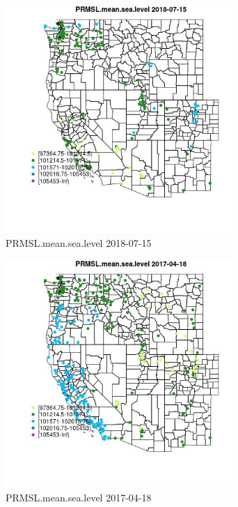 \begin{figure} 
\centering  
\includegraphics[width=0.77\textwidth]{Code_Outputs/Report_ML_input_PM25_Step4_part_e_de_duplicated_aves_compiled_2019-05-20wNAs_MapObsPRMSLmeansealevel2018-07-15.jpg} 
\caption{\label{fig:Report_ML_input_PM25_Step4_part_e_de_duplicated_aves_compiled_2019-05-20wNAsMapObsPRMSLmeansealevel2018-07-15}PRMSL.mean.sea.level 2018-07-15} 
\end{figure} 
 

\begin{figure} 
\centering  
\includegraphics[width=0.77\textwidth]{Code_Outputs/Report_ML_input_PM25_Step4_part_e_de_duplicated_aves_compiled_2019-05-20wNAs_MapObsPRMSLmeansealevel2017-04-18.jpg} 
\caption{\label{fig:Report_ML_input_PM25_Step4_part_e_de_duplicated_aves_compiled_2019-05-20wNAsMapObsPRMSLmeansealevel2017-04-18}PRMSL.mean.sea.level 2017-04-18} 
\end{figure} 
 

